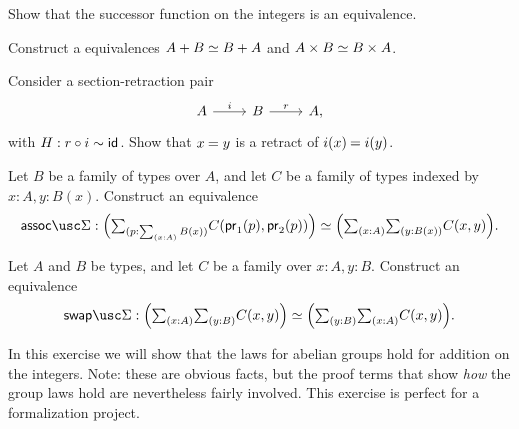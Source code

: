 \begin{exercises}
\begin{subexenum}
  \end{subexenum}
\item \label{ex:succ_equiv}Show that the successor function on the integers is an equivalence.
\item \label{ex:comm_prod}Construct a equivalences $\eqv{A+B}{B+A}$ and $\eqv{A\times B}{B\times A}$.
\item \label{ex:retr_id} Consider a section-retraction pair
  \begin{equation*}
    \begin{tikzcd}
      A \arrow[r,"i"] & B \arrow[r,"r"] & A,
    \end{tikzcd}
  \end{equation*}
  with $H:r\circ i\sim \mathsf{id}_{}$. Show that $\id{x}{y}$ is a retract of $\id{i(x)}{i(y)}$.
\item \label{ex:sigma_assoc}Let $B$ be a family of types over $A$, and let $C$ be a family of types indexed by $x:A,y:B(x)$. Construct an equivalence
  \begin{equation*}
    \assocSigma:\eqv{\Big(\sm{p:\sm{x:A}B(x)}C(\proj 1(p),\proj 2(p))\Big)}{\Big(\sm{x:A}\sm{y:B(x)}C(x,y)\Big)}.
  \end{equation*}
\item \label{ex:sigma_swap}Let $A$ and $B$ be types, and let $C$ be a family over $x:A,y:B$. Construct an equivalence
  \begin{equation*}
    \swapSigma:\eqv{\Big(\sm{x:A}{y:B}C(x,y)\Big)}{\Big(\sm{y:B}{x:A}C(x,y)\Big)}.
  \end{equation*}
\item \label{ex:int_group_laws} In this exercise we will show that the laws for abelian groups hold for addition on the integers. Note: these are obvious facts, but the proof terms that show \emph{how} the group laws hold are nevertheless fairly involved. This exercise is perfect for a formalization project. 

\end{exercises}
